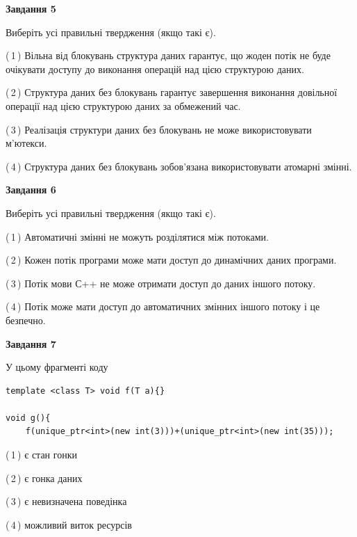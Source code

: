 \documentclass[12pt, ukrainian]{article}
\begin{document}
\begin {large}
{\begin{center}
\textbf{Завдання 5}
\end{center}

Виберіть усі правильні твердження (якщо такі є).\par
\vspace{2mm}

(\,1\,) Вільна від блокувань структура даних гарантує, що жоден потік не буде очікувати доступу до виконання операцій над цією структурою даних.%

(\,2\,) Структура даних без блокувань гарантує завершення виконання довільної операції над цією структурою даних за обмежений час.%

(\,3\,) Реалізація структури даних без блокувань не може використовувати м’ютекси.%

(\,4\,) Структура даних без блокувань зобов’язана використовувати атомарні змінні.%
\newpage


\begin{center}
\textbf{Завдання 6}
\end{center}

Виберіть усі правильні твердження (якщо такі є).\par
\vspace{2mm}

(\,1\,) Автоматичні змінні не можуть розділятися між потоками.%

(\,2\,) Кожен потік програми може мати доступ до динамічних даних програми.%

(\,3\,) Потік мови С++ не може отримати доступ до даних іншого потоку.%

(\,4\,) Потік може мати доступ до автоматичних змінних іншого потоку і це безпечно.%


\begin{center}
\textbf{Завдання 7}
\end{center}

У цьому фрагменті коду
\begin{verbatim}
template <class T> void f(T a){}

void g(){
    f(unique_ptr<int>(new int(3)))+(unique_ptr<int>(new int(35)));
\end{verbatim}

(\,1\,) є стан гонки%

(\,2\,) є гонка даних%

(\,3\,) є невизначена поведінка%

(\,4\,) можливий виток ресурсів%

}
\end {large}

\vspace{4mm}
\newpage
\end{document}

